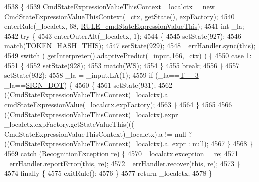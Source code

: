 \begin{DoxyCode}
4538                                                                                                            
                                   \{
4539     CmdStateExpressionValueThisContext \_localctx = \textcolor{keyword}{new} CmdStateExpressionValueThisContext(\_ctx, getState(),
       expFactory);
4540     enterRule(\_localctx, 68, \hyperlink{classgov_1_1nasa_1_1jpf_1_1inspector_1_1server_1_1expression_1_1parser_1_1_expression_grammar_parser_a05ebcff6095a1111ea18c23ed83898fd}{RULE\_cmdStateExpressionValueThis});
4541     \textcolor{keywordtype}{int} \_la;
4542     \textcolor{keywordflow}{try} \{
4543       enterOuterAlt(\_localctx, 1);
4544       \{
4545       setState(927);
4546       match(\hyperlink{classgov_1_1nasa_1_1jpf_1_1inspector_1_1server_1_1expression_1_1parser_1_1_expression_grammar_parser_af93758f3f9ebce6a3618d6e310b155d6}{TOKEN\_HASH\_THIS});
4547       setState(929);
4548       \_errHandler.sync(\textcolor{keyword}{this});
4549       \textcolor{keywordflow}{switch} ( getInterpreter().adaptivePredict(\_input,166,\_ctx) ) \{
4550       \textcolor{keywordflow}{case} 1:
4551         \{
4552         setState(928);
4553         match(\hyperlink{classgov_1_1nasa_1_1jpf_1_1inspector_1_1server_1_1expression_1_1parser_1_1_expression_grammar_parser_ace44714ae633c7b14794cc5a24d9ebf3}{WS});
4554         \}
4555         \textcolor{keywordflow}{break};
4556       \}
4557       setState(932);
4558       \_la = \_input.LA(1);
4559       \textcolor{keywordflow}{if} (\_la==\hyperlink{classgov_1_1nasa_1_1jpf_1_1inspector_1_1server_1_1expression_1_1parser_1_1_expression_grammar_parser_a68f9589dcc3fc777455467ff010385ea}{T\_\_3} || \_la==\hyperlink{classgov_1_1nasa_1_1jpf_1_1inspector_1_1server_1_1expression_1_1parser_1_1_expression_grammar_parser_af578d1cac8553bcf6f52608a4e9125f1}{SIGN\_DOT}) \{
4560         \{
4561         setState(931);
4562         ((CmdStateExpressionValueThisContext)\_localctx).a = 
      \hyperlink{classgov_1_1nasa_1_1jpf_1_1inspector_1_1server_1_1expression_1_1parser_1_1_expression_grammar_parser_a9c38888905b31e514c2e4a695b8b2be6}{cmdStateExpressionValue}(\_localctx.expFactory);
4563         \}
4564       \}
4565 
4566        ((CmdStateExpressionValueThisContext)\_localctx).expr =  \_localctx.expFactory.getStateValueThis(((
      CmdStateExpressionValueThisContext)\_localctx).a != null ? ((CmdStateExpressionValueThisContext)\_localctx).a.
      expr : null); 
4567       \}
4568     \}
4569     \textcolor{keywordflow}{catch} (RecognitionException re) \{
4570       \_localctx.exception = re;
4571       \_errHandler.reportError(\textcolor{keyword}{this}, re);
4572       \_errHandler.recover(\textcolor{keyword}{this}, re);
4573     \}
4574     \textcolor{keywordflow}{finally} \{
4575       exitRule();
4576     \}
4577     \textcolor{keywordflow}{return} \_localctx;
4578   \}
\end{DoxyCode}
